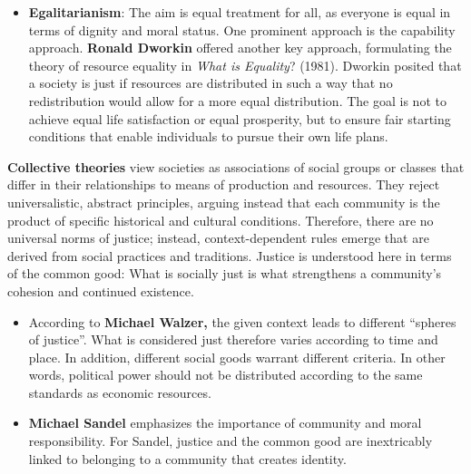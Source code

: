 \documentclass[
  a4paper,
  DIV=11,
  numbers=noendperiod,
  oneside,
  openany]{scrreprt}
\begin{document}
\begin{tcolorbox}
\begin{itemize}
  \begin{enumerate}
  \def\labelenumi{\arabic{enumi}.}
  \item
    Equal right to basic freedoms: Each person is entitled to the most
    comprehensive system of equal fundamental freedoms that is
    compatible with a similar system for everyone else.
  \item
    Just social and economic inequalities: Inequalities are only
    considered just if they meet two conditions: they benefit the least
    advantaged in society (``the difference principle''), and offices
    and positions are open to all under conditions of fair equality of
    opportunity.
  \end{enumerate}
\item
  \textbf{Egalitarianism}: The aim is equal treatment for all, as
  everyone is equal in terms of dignity and moral status. One prominent
  approach is the capability approach. \textbf{Ronald Dworkin} offered
  another key approach, formulating the theory of resource equality in
  \emph{What is Equality}? (1981). Dworkin posited that a society is
  just if resources are distributed in such a way that no redistribution
  would allow for a more equal distribution. The goal is not to achieve
  equal life satisfaction or equal prosperity, but to ensure fair
  starting conditions that enable individuals to pursue their own life
  plans.
\end{itemize}

\textbf{Collective theories} view societies as associations of social
groups or classes that differ in their relationships to means of
production and resources. They reject universalistic, abstract
principles, arguing instead that each community is the product of
specific historical and cultural conditions. Therefore, there are no
universal norms of justice; instead, context-dependent rules emerge that
are derived from social practices and traditions. Justice is understood
here in terms of the common good: What is socially just is what
strengthens a community's cohesion and continued existence.

\begin{itemize}
\item
  According to \textbf{Michael Walzer,} the given context leads to
  different ``spheres of justice''. What is considered just therefore
  varies according to time and place. In addition, different social
  goods warrant different criteria. In other words, political power
  should not be distributed according to the same standards as economic
  resources.
\item
  \textbf{Michael Sandel} emphasizes the importance of community and
  moral responsibility. For Sandel, justice and the common good are
  inextricably linked to belonging to a community that creates identity.
\end{itemize}

\end{tcolorbox}
\end{document}
